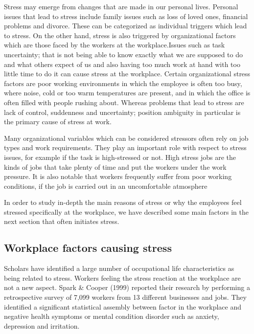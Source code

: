 Stress may emerge from changes that are made in our personal lives.  Personal issues that lead to stress include family issues such as loss of loved ones, financial problems and divorce.  These can be categorized as individual triggers which lead to stress.  On the other hand, stress is also triggered by organizational factors which are those faced by the workers at the workplace.Issues such as task uncertainty; that is not being able to know exactly what we are supposed to do and what others expect of us and also having too much work at hand with too little time to do it can cause stress at the workplace.  Certain organizational stress factors are poor working environments in which the employee is often too busy, where noise, cold or too warm temperatures are present, and in which the office is often filled with people rushing about.  Whereas problems that lead to stress are lack of control, suddenness and uncertainty; position ambiguity in particular is the primary cause of stress at work. \citep[p.350]{Parker2008PersonalityProcess}

Many organizational variables which can be considered stressors often rely on job types and work requirements.  They play an important role with respect to stress issues, for example if the task is high-stressed or not.  High stress jobs are the kinds of jobs that take plenty of time and put the workers under the work pressure. It is also notable that workers frequently suffer from poor working conditions, if the job is carried out in an uncomfortable atmosphere \cite[p.317]{Bloisi2007ManagementBehaviour}

In  order  to  study  in-depth  the  main  reasons  of  stress  or  why  the  employees  feel  stressed specifically at the workplace, we have described some main factors in the next section that often initiates stress.

\subsection{Workplace factors causing stress}

Scholars have identified a large number of occupational life characteristics as being related to stress.  Workers feeling the stress reaction at the workplace are not a new aspect. Spark \& Cooper (1999) reported their research by performing a retrospective survey of 7,099 workers from 13 different businesses and jobs.   They identified a significant statistical assembly between factor in the workplace and negative health symptoms or mental condition disorder such as anxiety, depression and irritation.

